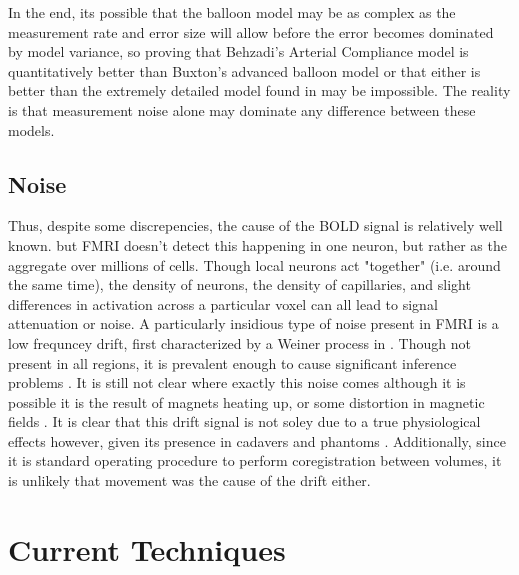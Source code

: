 \documentclass{article}
\begin{document}
In the end, its possible that the balloon model may be as complex as the
measurement rate and error size will allow before the error becomes dominated 
by model variance, so proving that
Behzadi's Arterial Compliance model is quantitatively better than Buxton's 
advanced balloon model \cite{Buxton2004} or that either is better than 
the extremely detailed model found in \cite{Zheng2005} may be impossible. 
The reality is that
measurement noise alone may dominate any difference between these models.

\subsection{Noise}
Thus, despite some discrepencies, the cause of the BOLD signal is
relatively well known.  but FMRI doesn't detect this happening in one neuron,
but rather as the 
aggregate over millions of cells. Though local neurons act
"together" (i.e. around the same time), the density of neurons, the
density of capillaries, and slight differences in activation across 
a particular voxel can all lead to signal attenuation or noise. 
A particularly insidious type of noise present in FMRI is a low frequncey
drift, first characterized by a Weiner process in \cite{Riera2004}. 
Though not present in all regions, it is prevalent enough to cause significant
inference problems \cite{Tanabe2002}. It is still not
clear where exactly this noise comes although it is possible it is 
the result of magnets heating up, or some distortion in magnetic
fields \cite{Smith2007}. It is clear that this drift signal is not soley
due to a true physiological
effects however, given its presence in cadavers and phantoms \cite{Smith1999}.
Additionally, since it is standard operating procedure to perform
coregistration between volumes, it is unlikely that movement was
the cause of the drift either.

\section{Current Techniques}
\end{document}
